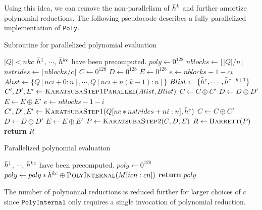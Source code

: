 \documentclass[hctr.tex]{subfiles}
\begin{document}
Using this idea, we can remove the non-parallelism of $\bar{h}^k$ and further amortize polynomial reductions. The following pseudocode describes a fully parallelized implementation of $\texttt{Poly}$.
\begin{algorithm}[H]
\caption{Subroutine for parallelized polynomial evaluation}\label{polyalgsub}
\begin{algorithmic}[1]
	\Require $|Q| < nkc$
	\Require $\bar{h}^1$, $\cdots$, $\bar{h}^{kc}$ have been precomputed.
		\State $poly \gets 0^{128}$
		\State $nblocks \gets \lfloor |Q|/n \rfloor$
		\State $nstrides \gets \lfloor nblocks/c \rfloor$
		\State $C \gets 0^{128}$
		\State $D \gets 0^{128}$
		\State $E \gets 0^{128}$
			\State $e \gets nblocks - 1 - ci$
			\State $Alist \gets \{Q[nci + 0 : n], \cdots, Q[nci + n(k - 1) : n]\}$
			\State $Blist \gets \{\bar{h}^{e}, \cdots, \bar{h}^{e - k + 1}\}$
			\State $C', D', E' \gets \Call{KaratsubaStep1Parallel}{Alist, Blist}$
			\State $C \gets C \oplus C'$
			\State $D \gets D \oplus D'$
			\State $E \gets E \oplus E'$
		\EndFor
			\State $e \gets nblocks - 1 - i$
			\State $C', D', E' \gets \Call{KaratsubaStep1}{Q[nc*nstrides + ni : n], \hgen^{e}}$
			\State $C \gets C \oplus C'$
			\State $D \gets D \oplus D'$
			\State $E \gets E \oplus E'$
		\EndFor
		\State $P \gets \Call{KaratsubaStep2}{C, D, E}$
		\State $R \gets \Call{Barrett}{P}$
		\State \textbf{return} $R$
	\EndProcedure
\end{algorithmic}
\end{algorithm}

\begin{algorithm}[H]
\caption{Parallelized polynomial evaluation}\label{polyalg}
\begin{algorithmic}[1]
	\Require $\bar{h}^1$, $\cdots$, $\bar{h}^{kc}$ have been precomputed.
		\State $poly \gets 0^{128}$
			\State $poly \gets poly*\hgen^{kc} \oplus \Call{PolyInternal}{M[icn : cn]}$
		\EndFor
		\State \textbf{return} $poly$
	\EndProcedure
\end{algorithmic}
\end{algorithm}
The number of polynomial reductions is reduced further for larger choices of $c$ since $\texttt{PolyInternal}$ only requires a single invocation of polynomial reduction.
\end{document}
